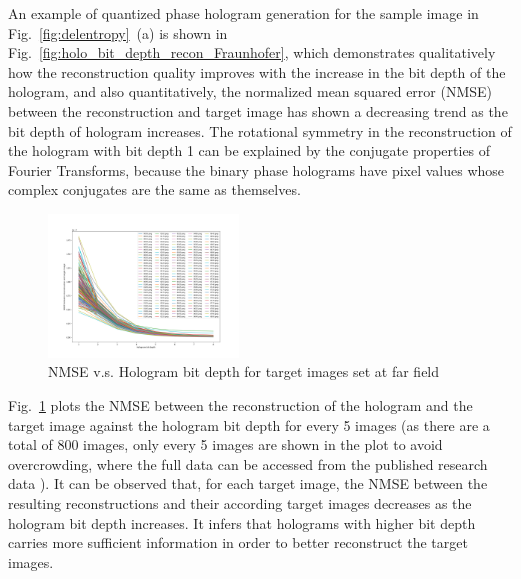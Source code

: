 	An example of quantized phase hologram generation for the sample image in Fig.~\ref{fig:delentropy}~(a) is shown in Fig.~\ref{fig:holo_bit_depth_recon_Fraunhofer}, which demonstrates qualitatively how the reconstruction quality improves with the increase in the bit depth of the hologram, and also quantitatively, the normalized mean squared error (NMSE) between the reconstruction and target image has shown a decreasing trend as the bit depth of hologram increases. The rotational symmetry in the reconstruction of the hologram with bit depth 1 can be explained by the conjugate properties of Fourier Transforms, because the binary phase holograms have pixel values whose complex conjugates are the same as themselves. 
	
	
	\begin{figure} [ht]
	   \begin{center}
	   \includegraphics[trim={80 50 90 70}, clip, width = 0.45\textwidth]{GS_Fraunhofer_NMSE_VS_Hologram bit depth.png}
	   \end{center}
	   \caption{\label{fig:GS_Fraunhofer_NMSE_VS_Hologram_bit_depth} NMSE v.s. Hologram bit depth for target images set at far field}
	\end{figure}
	
	Fig.~\ref{fig:GS_Fraunhofer_NMSE_VS_Hologram_bit_depth} plots the NMSE between the reconstruction of the hologram and the target image against the hologram bit depth for every 5 images (as there are a total of 800 images, only every 5 images are shown in the plot to avoid overcrowding, where the full data can be accessed from the published research data \cite{research_data_Sha2024}). It can be observed that, for each target image, the NMSE between the resulting reconstructions and their according target images decreases as the hologram bit depth increases. It infers that holograms with higher bit depth carries more sufficient information in order to better reconstruct the target images. 
	
